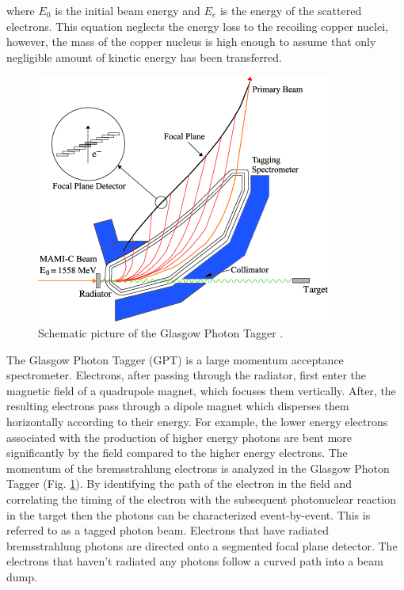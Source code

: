 where $E_{0}$ is the initial beam energy and $E_{e}$ is the energy of the scattered electrons. This equation neglects the energy loss to the recoiling copper nuclei, however, the mass of the copper nucleus is high enough to assume that only negligible amount of kinetic energy has been transferred.

\begin{figure}[H]
\begin{center}
\includegraphics[scale=0.9]{pictures/png/GlaTagger.png}
\caption{Schematic picture of the Glasgow Photon Tagger \cite{marcu}.}
\label{gpt}
\end{center}
\end{figure}

\indent The Glasgow Photon Tagger (GPT) is a large momentum acceptance spectrometer. Electrons, after passing through the radiator, first enter the magnetic field of a quadrupole magnet, which focuses them vertically. After, the resulting electrons pass through a dipole magnet which disperses them horizontally according to their energy. For example, the lower energy electrons associated with the production of higher energy photons are bent more significantly by the field compared to the higher energy electrons. The momentum of the bremsstrahlung electrons is analyzed in the Glasgow Photon Tagger (Fig. \ref{gpt}). By identifying the path of the electron in the field and correlating the timing of the electron with the subsequent photonuclear reaction in the target then the photons can be characterized event-by-event. This is referred to as a tagged photon beam. Electrons that have radiated bremsstrahlung photons are directed onto a segmented focal plane detector. The electrons that haven't radiated any photons follow a curved path into a beam dump.

